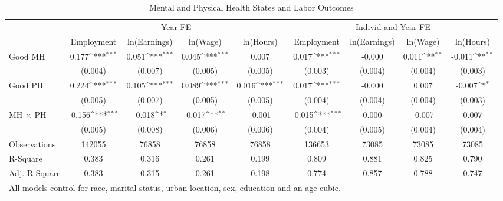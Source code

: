 \def\sym#1{\ifmmode^{#1}\else\(^{#1}\)\fi}
\begin{table}
\center\caption*{Mental and Physical Health States and Labor Outcomes}
\footnotesize
\begin{tabular}{l*{8}{c}}
                    &\multicolumn{4}{c}{\underline{Year FE}}                                                &\multicolumn{4}{c}{\underline{Individ and Year FE}}                                    \\\cmidrule(lr){2-5}\cmidrule(lr){6-9}
                    &\multicolumn{1}{c}{Employment}&\multicolumn{1}{c}{ln(Earnings)}&\multicolumn{1}{c}{ln(Wage)}&\multicolumn{1}{c}{ln(Hours)}&\multicolumn{1}{c}{Employment}&\multicolumn{1}{c}{ln(Earnings)}&\multicolumn{1}{c}{ln(Wage)}&\multicolumn{1}{c}{ln(Hours)}\\
\midrule
Good MH             &       0.177\sym{***}&       0.051\sym{***}&       0.045\sym{***}&       0.007         &       0.017\sym{***}&      -0.000         &       0.011\sym{**} &      -0.011\sym{**} \\
                    &     (0.004)         &     (0.007)         &     (0.005)         &     (0.005)         &     (0.003)         &     (0.004)         &     (0.004)         &     (0.003)         \\
Good PH             &       0.224\sym{***}&       0.105\sym{***}&       0.089\sym{***}&       0.016\sym{***}&       0.017\sym{***}&      -0.000         &       0.007         &      -0.007\sym{*}  \\
                    &     (0.005)         &     (0.007)         &     (0.005)         &     (0.005)         &     (0.004)         &     (0.004)         &     (0.004)         &     (0.003)         \\
MH $\times$ PH      &      -0.156\sym{***}&      -0.018\sym{*}  &      -0.017\sym{**} &      -0.001         &      -0.015\sym{***}&       0.000         &      -0.007         &       0.007         \\
                    &     (0.005)         &     (0.008)         &     (0.006)         &     (0.006)         &     (0.004)         &     (0.005)         &     (0.004)         &     (0.004)         \\
\midrule
Observations        &      142055         &       76858         &       76858         &       76858         &      136653         &       73085         &       73085         &       73085         \\
R-Square            &       0.383         &       0.316         &       0.261         &       0.199         &       0.809         &       0.881         &       0.825         &       0.790         \\
Adj. R-Square       &       0.383         &       0.315         &       0.261         &       0.198         &       0.774         &       0.857         &       0.788         &       0.747         \\
\bottomrule
\multicolumn{9}{l}{\footnotesize{All models control for race, marital status, urban location, sex, education and an age cubic.}} \\
\end{tabular}
\end{table}
